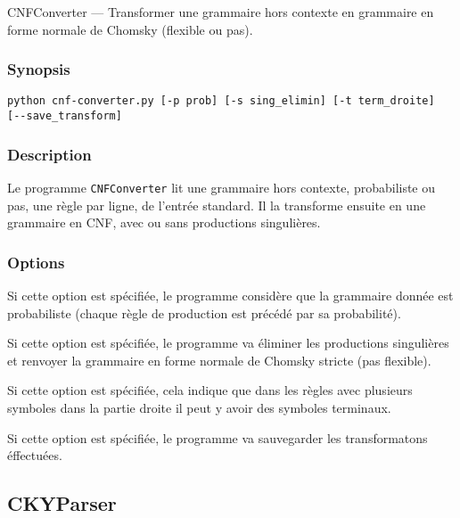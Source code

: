\documentclass[12pt]{article}
\begin{document}
CNFConverter --- Transformer une grammaire hors contexte en grammaire en forme
normale de Chomsky (flexible ou pas).
 
\subsubsection{Synopsis}
 
{\ttfamily
\begin{verbatim}
python cnf-converter.py [-p prob] [-s sing_elimin] [-t term_droite]
[--save_transform]
\end{verbatim}
}
 
\subsubsection{Description}
 
Le programme \texttt{CNFConverter} lit une grammaire hors contexte, probabiliste
ou pas, une r\`egle par ligne, de l'entr\'ee standard.
Il la transforme ensuite en une grammaire en CNF, avec ou sans productions
singuli\`eres. 

\subsubsection{Options}

\begin{description}[style=nextline]
\item[\texttt{-p, --prob}] Si cette option est sp\'ecifi\'ee, le programme consid\`ere
que la grammaire donn\'ee est probabiliste (chaque r\`egle de production est
pr\'ec\'ed\'e par sa probabilit\'e).
\item[\texttt{-s, --sing\_elimin}] Si cette option est sp\'ecifi\'ee, le programme
va \'eliminer les productions singuli\`eres et renvoyer la grammaire en forme normale
de Chomsky stricte (pas flexible).
\item[\texttt{-t, --term\_droite}] Si cette option est sp\'ecifi\'ee, cela
indique que dans les r\`egles avec plusieurs symboles dans la partie
droite il peut y avoir des symboles terminaux.
\item[\texttt{--save\_transform}] Si cette option est sp\'ecifi\'ee, le programme va
sauvegarder les transformatons \'effectu\'ees.
\end{description}

\subsection{CKYParser}
\end{document}
